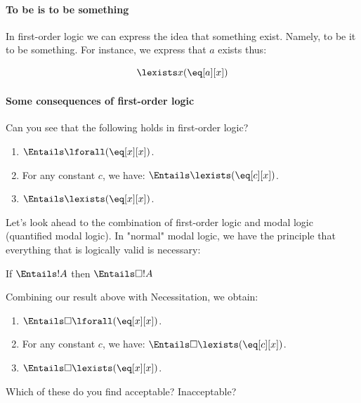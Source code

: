\documentclass[../../../include/open-logic-section]{subfiles}
\begin{document}


\paragraph{To be is to be something} In first-order logic we can express the idea that something exist. Namely, to be it to be something. For instance, we express that $a$ exists thus:

$$\lexists x(\eq[a][x])$$

\paragraph{Some consequences of first-order logic}

Can you see that the following holds in first-order logic? 

\begin{enumerate}
	\item $\Entails \lforall (\eq[x][x])$.
	\item For any constant $c$, we have: $\Entails \lexists (\eq[c][x])$.
	\item $\Entails \lexists (\eq[x][x])$.
\end{enumerate} 

Let's look ahead to the combination of first-order logic and modal logic (quantified modal logic). In "normal" modal logic, we have the principle that everything that is logically valid is necessary:

\begin{defn}[Necessitation]
If $\Entails !A$ then $\Entails \Box !A$ 
\end{defn}

Combining our result above with Necessitation, we obtain: 

\begin{enumerate}
	\item $\Entails \Box \lforall (\eq[x][x])$.
	\item For any constant $c$, we have: $\Entails \Box \lexists (\eq[c][x])$.
	\item $\Entails \Box \lexists (\eq[x][x])$.
\end{enumerate} 

Which of these do you find acceptable? Inacceptable?
\end{document}
